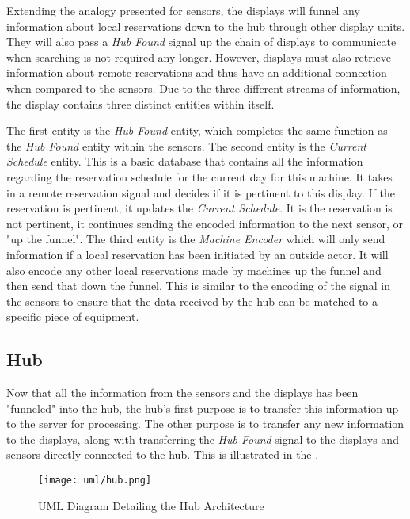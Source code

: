 \documentclass[PPFS.tex]{template/subfiles}
\newcommand{\sn}[1]{\textit{#1}}
\begin{document}
Extending the analogy presented for sensors, the displays will funnel any information about local reservations down to the hub through other display units. They will also pass a \sn{Hub Found} signal up the chain of displays to communicate when searching is not required any longer. However, displays must also retrieve information about remote reservations and thus have an additional connection when compared to the sensors. Due to the three different streams of information, the display contains three distinct entities within itself.

The first entity is the \sn{Hub Found} entity, which completes the same function as the \sn{Hub Found} entity within the sensors. The second entity is the \sn{Current Schedule} entity. This is a basic database that contains all the information regarding the reservation schedule for the current day for this machine. It takes in a remote reservation signal and decides if it is pertinent to this display. If the reservation is pertinent, it updates the \sn{Current Schedule}. It is the reservation is not pertinent, it continues sending the encoded information to the next sensor, or "up the funnel". The third entity is the \sn{Machine Encoder} which will only send information if a local reservation has been initiated by an outside actor. It will also encode any other local reservations made by machines up the funnel and then send that down the funnel. This is similar to the encoding of the signal in the sensors to ensure that the data received by the hub can be matched to a specific piece of equipment.

\subsection{Hub}

Now that all the information from the sensors and the displays has been "funneled" into the hub, the hub's first purpose is to transfer this information up to the server for processing. The other purpose is to transfer any new information to the displays, along with transferring the \sn{Hub Found} signal to the displays and sensors directly connected to the hub. This is illustrated in the .

\begin{figure}[H]
    \centering
    \texttt{[image: uml/hub.png]}
    \caption{UML Diagram Detailing the Hub Architecture}
    \label{fig:hub_arch}
\end{figure}
\end{document}
